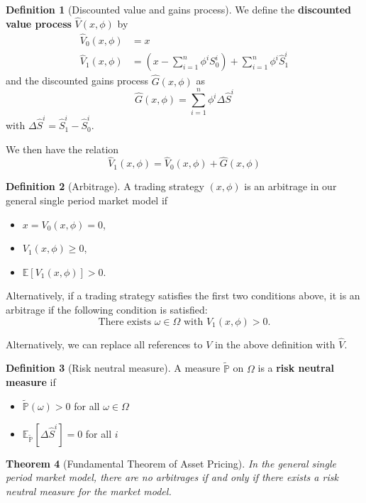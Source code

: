 \documentclass[10pt, oneside, reqno]{amsart}
\theoremstyle{plain}%
\newtheorem{thm}{Theorem}[subsection]
\theoremstyle{definition}
\newtheorem{defn}[thm]{Definition}
\theoremstyle{remark}
\newcommand{\expc}[1]{\mathbb{E}\left[#1\right]}
\newcommand{\sumni}{\sum_{i=1}^n}
\newcommand{\rnm}{\tilde{\mathbb{P}}}
\begin{document}
\begin{defn}[Discounted value and gains process]
We define the \textbf{discounted value process} $\hat{V}(x,\phi)$ by \begin{align*}
    \hat{V}_0 (x,\phi) &= x \\
    \hat{V}_1 (x,\phi) &= (x - \sumni \phi^i S^i_0) + \sumni \phi^i \hat{S}^i_1
\end{align*}
and the discounted gains process $\hat{G}(x,\phi)$ as \[
    \hat{G}(x,\phi) = \sumni \phi^i \Delta \hat{S}^i
\] with $\Delta \hat{S}^i = \hat{S}^i_1 - \hat{S}^i_0$.
\end{defn}

We then have the relation \[
    \hat{V}_1(x,\phi) = \hat{V}_0(x,\phi) + \hat{G}(x,\phi)
\]


\begin{defn}[Arbitrage]
    
    A trading strategy $(x,\phi)$ is an arbitrage in our general single period market model if
    \begin{itemize}
        \item $x = V_0(x,\phi) = 0$, 
        \item $V_1(x,\phi) \geq 0$,
        \item $\expc{V_1(x,\phi)} > 0$. 
    \end{itemize}
    
    Alternatively, if a trading strategy satisfies the first two conditions above, it is an arbitrage if the following condition is satisfied: \[
        \text{There exists } \omega \in \Omega \text{ with } V_1(x,\phi) > 0.
    \]

Alternatively, we can replace all references to $V$ in the above definition with $\hat{V}$.
\end{defn}

\begin{defn}[Risk neutral measure]
    A measure $\rnm$ on $\Omega$ is a \textbf{risk neutral measure} if 
    \begin{itemize}
        \item $\rnm(\omega) > 0$ for all $\omega \in \Omega$
        \item $\mathbb{E}_{\rnm} \left[\Delta \hat{S}^i \right] = 0$ for all $i$
    \end{itemize}
\end{defn}

\begin{thm}[Fundamental Theorem of Asset Pricing]
    In the general single period market model, there are no arbitrages if and only if there exists a risk neutral measure for the market model.
\end{thm}
\end{document}
